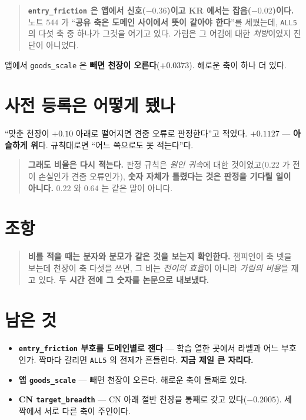 \documentclass[11pt]{article}
\begin{document}
\begin{quote}
\textbf{\texttt{entry\_friction} 은 앱에서 신호($-0.36$)이고 KR 에서는
잡음($-0.02$)이다.} 노트 $544$ 가 ``\textbf{공유 축은 도메인 사이에서 뜻이
같아야 한다}''를 세웠는데, \texttt{ALL5} 의 다섯 축 중 하나가 그것을
어기고 있다. 가림은 그 어김에 대한 \emph{처방}이었지 진단이 아니었다.
\end{quote}

앱에서 \texttt{goods\_scale} 은 \textbf{빼면 천장이 오른다}($+0.0373$).
해로운 축이 하나 더 있다.

\section*{사전 등록은 어떻게 됐나}

``맞춘 천장이 $+0.10$ 아래로 떨어지면 견줌 오류로 판정한다''고 적었다.
$+0.1127$ --- \textbf{아슬하게 위}다. 규칙대로면 ``어느 쪽으로도 못
적는다''다.

\begin{quote}
\textbf{그래도 비율은 다시 적는다.} 판정 규칙은 \emph{원인 귀속}에 대한
것이었고($0.22$ 가 전이 손실인가 견줌 오류인가), \textbf{숫자 자체가
틀렸다는 것은 판정을 기다릴 일이 아니다.} $0.22$ 와 $0.64$ 는 같은 말이
아니다.
\end{quote}

\section*{조항}

\begin{quote}
\textbf{비를 적을 때는 분자와 분모가 같은 것을 보는지 확인한다.}
챔피언이 축 넷을 보는데 천장이 축 다섯을 쓰면, 그 비는 \emph{전이의
효율}이 아니라 \emph{가림의 비용}을 재고 있다. \textbf{두 시간 전에 그
숫자를 논문으로 내보냈다.}
\end{quote}

\section*{남은 것}

\begin{itemize}
\item \textbf{\texttt{entry\_friction} 부호를 도메인별로 잰다} --- 학습
열한 곳에서 라벨과 어느 부호인가. 짝마다 갈리면 \texttt{ALL5} 의 전제가
흔들린다. \textbf{지금 제일 큰 자리다.}
\item \textbf{앱 \texttt{goods\_scale}} --- 빼면 천장이 오른다. 해로운 축이
둘째로 있다.
\item \textbf{CN \texttt{target\_breadth}} --- CN 아래 절반 천장을 통째로
갖고 있다($-0.2005$). 세 짝에서 서로 다른 축이 주인이다.
\end{itemize}
\end{document}
